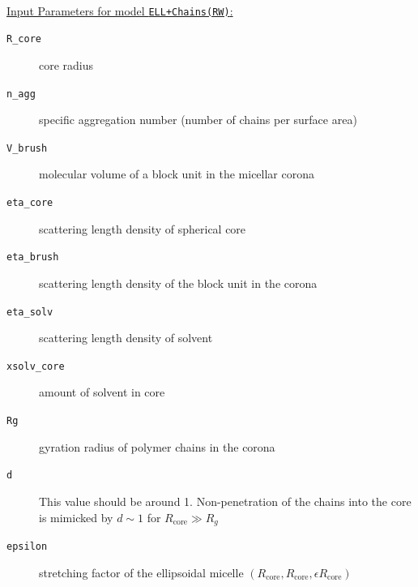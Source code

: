 \hspace{1pt}\\
\uline{Input Parameters for model \texttt{ELL+Chains(RW)}:}\\
\begin{description}
\item[\texttt{R\_core}] core radius
\item[\texttt{n\_agg}] specific aggregation number (number of chains per surface area)
\item[\texttt{V\_brush}]  molecular volume of a block unit in the micellar corona
\item[\texttt{eta\_core}] scattering length density of spherical core
\item[\texttt{eta\_brush}] scattering length density of the block unit in the corona
\item[\texttt{eta\_solv}] scattering length density of solvent
\item[\texttt{xsolv\_core}] amount of solvent in core
\item[\texttt{Rg}] gyration radius of polymer chains in the corona
\item[\texttt{d}] This value should be around 1. Non-penetration of the chains
into the core is mimicked by $d\sim 1$ for $R_\text{core}\gg R_g$
\item[\texttt{epsilon}] stretching factor of the ellipsoidal micelle
$(R_\text{core},R_\text{core},\epsilon R_\text{core})$
\end{description}

\vspace{10mm}

